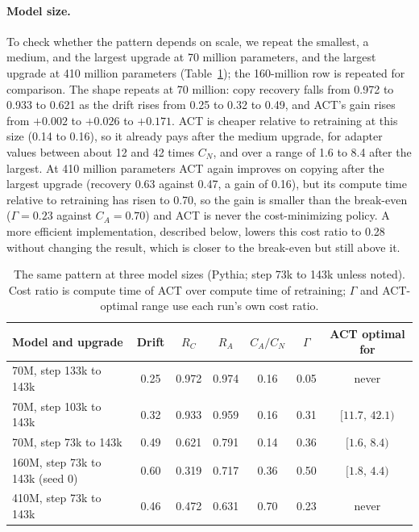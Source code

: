 \documentclass[ijoc,nonblindrev]{informs4}
\begin{document}
\paragraph{Model size.} To check whether the pattern depends on scale, we repeat the smallest, a medium, and the largest upgrade at 70 million parameters, and the largest upgrade at 410 million parameters (Table~\ref{tab:scale}); the 160-million row is repeated for comparison.
The shape repeats at 70 million: copy recovery falls from 0.972 to 0.933 to 0.621 as the drift rises from 0.25 to 0.32 to 0.49, and ACT's gain rises from $+0.002$ to $+0.026$ to $+0.171$. ACT is cheaper relative to retraining at this size (0.14 to 0.16), so it already pays after the medium upgrade, for adapter values between about 12 and 42 times $C_N$, and over a range of 1.6 to 8.4 after the largest.
At 410 million parameters ACT again improves on copying after the largest upgrade (recovery 0.63 against 0.47, a gain of 0.16), but its compute time relative to retraining has risen to 0.70, so the gain is smaller than the break-even ($\Gamma=0.23$ against $C_A=0.70$) and ACT is never the cost-minimizing policy. A more efficient implementation, described below, lowers this cost ratio to 0.28 without changing the result, which is closer to the break-even but still above it.

\begin{table}[t]
\centering
\caption{The same pattern at three model sizes (Pythia; step 73k to 143k unless noted). Cost ratio is compute time of ACT over compute time of retraining; $\Gamma$ and ACT-optimal range use each run's own cost ratio.}\label{tab:scale}
\begin{tabular}{lcccccc}
\toprule
Model and upgrade & Drift & $R_C$ & $R_A$ & $C_A/C_N$ & $\Gamma$ & ACT optimal for\\
\midrule
70M, step 133k to 143k & 0.25 & 0.972 & 0.974 & 0.16 & 0.05 & never\\
70M, step 103k to 143k & 0.32 & 0.933 & 0.959 & 0.16 & 0.31 & $[11.7,\,42.1)$\\
70M, step 73k to 143k & 0.49 & 0.621 & 0.791 & 0.14 & 0.36 & $[1.6,\,8.4)$\\
160M, step 73k to 143k (seed 0) & 0.60 & 0.319 & 0.717 & 0.36 & 0.50 & $[1.8,\,4.4)$\\
410M, step 73k to 143k & 0.46 & 0.472 & 0.631 & 0.70 & 0.23 & never\\
\bottomrule
\end{tabular}
\end{table}
\end{document}
